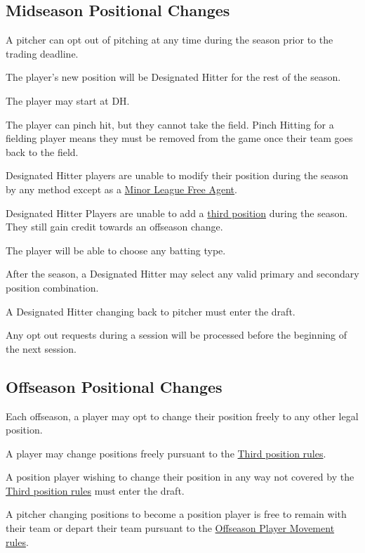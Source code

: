 \subsection{Midseason Positional Changes}
\begin{deepEnumerate}
	\item A pitcher can opt out of pitching at any time during the season prior to the trading deadline.
	\begin{deepEnumerate}
		\item The player's new position will be Designated Hitter for the rest of the season.
		\begin{deepEnumerate}
			\item The player may start at DH.
			\item The player can pinch hit, but they cannot take the field. Pinch Hitting for a fielding player means they must be removed from the game 
			once their team goes back to the field.
			\item Designated Hitter players are unable to modify their position during the season by any method except as a \hyperref[sec:MiLR FA]{Minor League Free Agent}.
			\item Designated Hitter Players are unable to add a \hyperref[sec:Third position]{third position} during the season. They still gain credit towards an offseason change.
		\end{deepEnumerate}
		\item The player will be able to choose any batting type.
		\item After the season, a Designated Hitter may select any valid primary and secondary position combination.
		\begin{deepEnumerate}
			\item A Designated Hitter changing back to pitcher must enter the draft.
		\end{deepEnumerate}
		\item Any opt out requests during a session will be processed before the beginning of the next session.
	\end{deepEnumerate}
\end{deepEnumerate}

\subsection{Offseason Positional Changes}
\label{sec:OPC}
\begin{deepEnumerate}
	\item Each offseason, a player may opt to change their position freely to any other legal position.
	\item A player may change positions freely pursuant to the \hyperref[sec:Third position]{Third position rules}.
	\item A position player wishing to change their position in any way not covered by the \hyperref[sec:Third position]{Third position rules} must enter the draft.
	\item A pitcher changing positions to become a position player is free to remain with their team or depart their team pursuant to the
	\hyperref[sec:OPM]{Offseason Player Movement rules}.
\end{deepEnumerate}


